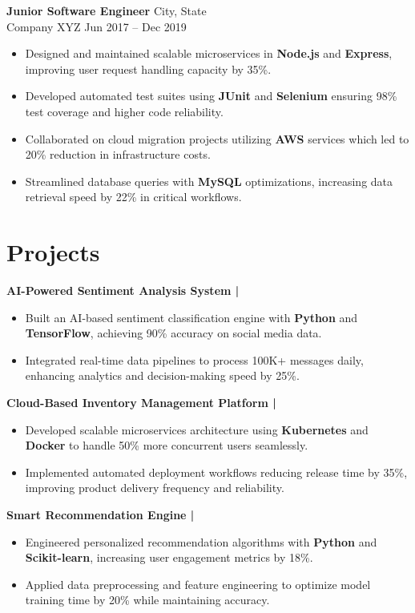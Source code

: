\documentclass[a4paper]{article}
\begin{document}
\textbf{Junior Software Engineer} \hfill City, State \\
Company XYZ \hfill Jun 2017 -- Dec 2019
\begin{itemize}
\item Designed and maintained scalable microservices in \textbf{Node.js} and \textbf{Express}, improving user request handling capacity by 35\%.
\item Developed automated test suites using \textbf{JUnit} and \textbf{Selenium} ensuring 98\% test coverage and higher code reliability.
\item Collaborated on cloud migration projects utilizing \textbf{AWS} services which led to 20\% reduction in infrastructure costs.
\item Streamlined database queries with \textbf{MySQL} optimizations, increasing data retrieval speed by 22\% in critical workflows.
\end{itemize}

\section*{Projects}

\textbf{AI-Powered Sentiment Analysis System |} 
\begin{itemize}
\item Built an AI-based sentiment classification engine with \textbf{Python} and \textbf{TensorFlow}, achieving 90\% accuracy on social media data.
\item Integrated real-time data pipelines to process 100K+ messages daily, enhancing analytics and decision-making speed by 25\%.
\end{itemize}

\textbf{Cloud-Based Inventory Management Platform |} 
\begin{itemize}
\item Developed scalable microservices architecture using \textbf{Kubernetes} and \textbf{Docker} to handle 50\% more concurrent users seamlessly.
\item Implemented automated deployment workflows reducing release time by 35\%, improving product delivery frequency and reliability.
\end{itemize}

\textbf{Smart Recommendation Engine |} 
\begin{itemize}
\item Engineered personalized recommendation algorithms with \textbf{Python} and \textbf{Scikit-learn}, increasing user engagement metrics by 18\%.
\item Applied data preprocessing and feature engineering to optimize model training time by 20\% while maintaining accuracy.
\end{itemize}
\end{document}
